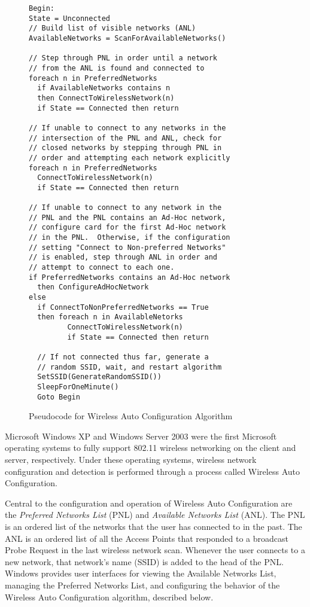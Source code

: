 \documentclass[10pt,twocolumn]{article}
\begin{document}
\begin{figure}
\begin{verbatim}
Begin:  
State = Unconnected
// Build list of visible networks (ANL)
AvailableNetworks = ScanForAvailableNetworks()

// Step through PNL in order until a network
// from the ANL is found and connected to
foreach n in PreferredNetworks
  if AvailableNetworks contains n
  then ConnectToWirelessNetwork(n)
  if State == Connected then return

// If unable to connect to any networks in the
// intersection of the PNL and ANL, check for
// closed networks by stepping through PNL in
// order and attempting each network explicitly
foreach n in PreferredNetworks
  ConnectToWirelessNetwork(n)
  if State == Connected then return

// If unable to connect to any network in the
// PNL and the PNL contains an Ad-Hoc network,
// configure card for the first Ad-Hoc network
// in the PNL.  Otherwise, if the configuration
// setting "Connect to Non-preferred Networks"
// is enabled, step through ANL in order and
// attempt to connect to each one.
if PreferredNetworks contains an Ad-Hoc network
  then ConfigureAdHocNetwork
else
  if ConnectToNonPreferredNetworks == True
  then foreach n in AvailableNetorks
         ConnectToWirelessNetwork(n)
         if State == Connected then return

  // If not connected thus far, generate a 
  // random SSID, wait, and restart algorithm
  SetSSID(GenerateRandomSSID())
  SleepForOneMinute()
  Goto Begin
\end{verbatim}
\caption{Pseudocode for Wireless Auto Configuration Algorithm}
\label{wzcalg}
\end{figure}

Microsoft Windows XP and Windows Server 2003 were the first Microsoft
operating systems to fully support 802.11 wireless networking on the
client and server, respectively.  Under these operating systems,
wireless network configuration and detection is performed through a
process called Wireless Auto Configuration.

Central to the configuration and operation of Wireless Auto
Configuration are the {\it Preferred Networks List} (PNL) and {\it
Available Networks List} (ANL).  The PNL is an ordered list of the
networks that the user has connected to in the past.  The ANL is an
ordered list of all the Access Points that responded to a broadcast
Probe Request in the last wireless network scan.  Whenever the user
connects to a new network, that network's name (SSID) is added to the
head of the PNL.  Windows provides user interfaces for viewing the
Available Networks List, managing the Preferred Networks List, and
configuring the behavior of the Wireless Auto Configuration algorithm,
described below.
\end{document}
